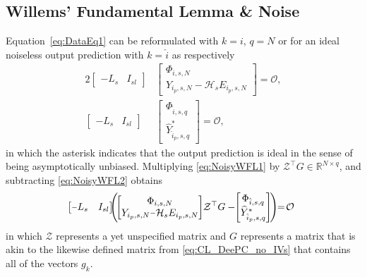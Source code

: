 \subsection{Willems' Fundamental Lemma \& Noise}
Equation~\eqref{eq:DataEq1} can be reformulated with $k=i$, $q=N$ or for an ideal noiseless output prediction with $k=\hat{i}$ as respectively
\begin{alignat}{2}
    \begin{bmatrix}
        -L_s & I_{sl}
    \end{bmatrix}&
    \begin{bmatrix}
        \Phi_{i,s,N}\\
        Y_{i_p,s,N}-\mathcal{H}_s E_{i_p,s,N}
    \end{bmatrix} = \mathcal{O},\label{eq:NoisyWFL1}\\%
    \begin{bmatrix}
        -L_s & I_{sl}
    \end{bmatrix}&
    \begin{bmatrix}
        \Phi_{\hat{i},s,q}\\
        \widehat{Y}^*_{\hat{i}_p,s,q}
    \end{bmatrix} = \mathcal{O}, \label{eq:NoisyWFL2}
\end{alignat}
in which the asterisk indicates that the output prediction is ideal in the sense of being asymptotically unbiased. Multiplying \eqref{eq:NoisyWFL1} by $\mathcal{Z}^\top G\in\mathbb{R}^{N\times q}$, and subtracting \eqref{eq:NoisyWFL2} obtains
\begin{align}\label{eq:NoisyWFL3}
    \mkern-14mu\begin{bmatrix}
        \shortminus L_s & I_{sl}
    \end{bmatrix}
    \mkern-9mu\left(\mkern-3mu%
    \begin{bmatrix}
        \Phi_{i,s,N}\\
        Y_{i_p,s,N}\shortminus\mathcal{H}_s E_{i_p,s,N}
    \end{bmatrix}%
    \mkern-4mu\mathcal{Z}^\top G%
    -%
    \mkern-5mu\begin{bmatrix}
        \Phi_{\hat{i},s,q}\\
        \widehat{Y}^*_{\hat{i}_p,s,q}
    \end{bmatrix}\mkern-3mu\right)\mkern-6mu=\mkern-3mu\mathcal{O}\mkern-5mu%
\end{align}
in which $\mathcal{Z}$ represents a yet unspecified matrix and $G$ represents a matrix that is akin to the likewise defined matrix from \eqref{eq:CL_DeePC_no_IVs} that contains all of the vectors $g_k$.

